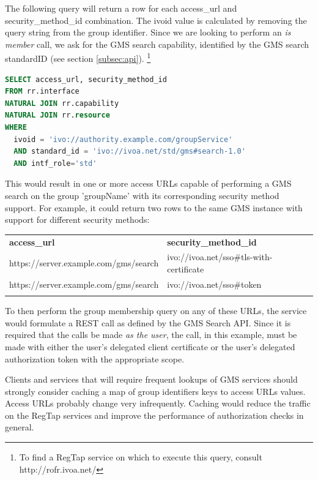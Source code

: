 \documentclass[11pt,a4paper]{ivoa}
\begin{document}
The following query will return a row for each access\_url and security\_method\_id combination.  The ivoid value is calculated by removing the query string from the group identifier.  Since we are looking to perform an \emph{is member} call, we ask for the GMS search capability, identified by the GMS search standardID (see section \ref{subsec:api}). \footnote{To find a RegTap service on which to execute this query, consult http://rofr.ivoa.net/}

\begin{lstlisting}[language=SQL,xleftmargin=2em]
SELECT access_url, security_method_id
FROM rr.interface
NATURAL JOIN rr.capability
NATURAL JOIN rr.resource
WHERE
  ivoid = 'ivo://authority.example.com/groupService'
  AND standard_id = 'ivo://ivoa.net/std/gms#search-1.0'
  AND intf_role='std'
\end{lstlisting}

This would result in one or more access URLs capable of performing a GMS search on the group 'groupName' with its corresponding security method support.  For example, it could return two rows to the same GMS instance with support for different security methods:

\vspace{3mm}
\hskip-1.0cm
\begin{tabular}{l l}
\textbf{access\_url} & \textbf{security\_method\_id} \\
\sptablerule
https://server.example.com/gms/search & ivo://ivoa.net/sso\#tls-with-certificate \\
https://server.example.com/gms/search & ivo://ivoa.net/sso\#token \\
\sptablerule
\end{tabular}
\vspace{3mm}

To then perform the group membership query on any of these URLs, the service would formulate a REST call as defined by the GMS Search API.  Since it is required that the calls be made \emph{as the user}, the call, in this example, must be made with either the user's delegated client certificate or the user's delegated authorization token with the appropriate scope.

Clients and services that will require frequent lookups of GMS services should strongly consider caching a map of group identifiers keys to access URLs values. Access URLs probably change very infrequently.  Caching would reduce the traffic on the RegTap services and improve the performance of authorization checks in general.
\end{document}
